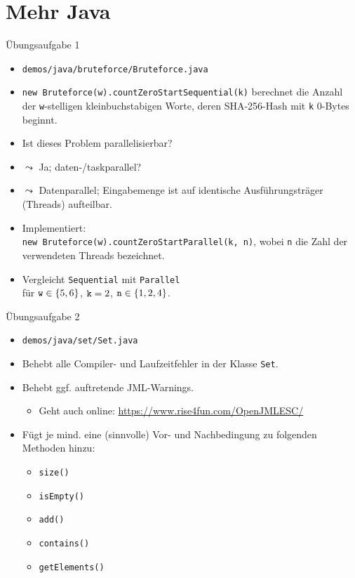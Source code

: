 \documentclass{beamer}
\begin{document}
\section{Mehr Java}

\begin{frame}{Übungsaufgabe 1}
	\begin{itemize}
		\item \texttt{demos/java/bruteforce/Bruteforce.java}
		\item \texttt{new Bruteforce(w).countZeroStartSequential(k)} berechnet die Anzahl der \texttt{w}-stelligen kleinbuchstabigen Worte, deren SHA-256-Hash mit \texttt{k} 0-Bytes beginnt.
		\item Ist dieses Problem parallelisierbar?
		\pause
		\item $\leadsto$ Ja; daten-/taskparallel?
		\pause
		\item $\leadsto$ Datenparallel; Eingabemenge ist auf identische Ausführungsträger (Threads) aufteilbar.
		\pause
		\item Implementiert:\\
		      \texttt{new Bruteforce(w).countZeroStartParallel(k, n)}, wobei \texttt{n} die Zahl der verwendeten Threads bezeichnet.
	        \item Vergleicht \texttt{Sequential} mit \texttt{Parallel}\\
		      für $\textrm{\texttt{w}} \in \{ 5, 6 \}$, $\textrm{\texttt{k}} = 2$, $\textrm{\texttt{n}} \in \{ 1, 2, 4 \}$.
	\end{itemize}
\end{frame}

\begin{frame}{Übungsaufgabe 2}
	\begin{itemize}
		\item \texttt{demos/java/set/Set.java}
		\item Behebt alle Compiler- und Laufzeitfehler in der Klasse \texttt{Set}.
		\pause
		\item Behebt ggf. auftretende JML-Warnings.
		\begin{itemize}
			\item Geht auch online: \url{https://www.rise4fun.com/OpenJMLESC/}
		\end{itemize}
		\pause
		\item Fügt je mind. eine (sinnvolle) Vor- und Nachbedingung zu folgenden Methoden hinzu:
		\begin{itemize}
			\item \texttt{size()}
			\item \texttt{isEmpty()}
			\item \texttt{add()}
			\item \texttt{contains()}
			\item \texttt{getElements()}
		\end{itemize}
	\end{itemize}
\end{frame}
\end{document}
